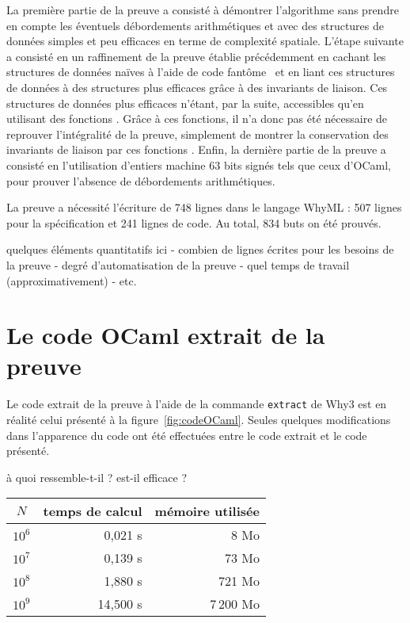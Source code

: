 \documentclass[a4paper]{easychair}
\begin{document}
La première partie de la preuve a consisté à démontrer l'algorithme sans prendre
en compte les éventuels débordements arithmétiques et avec des structures
de données simples et peu efficaces en terme de complexité spatiale.
L'étape suivante a consisté en un raffinement de la preuve établie précédemment
en cachant les structures de données naïves à l'aide de code
fantôme~\cite{ghost-code} et en liant ces structures de données à des structures
plus efficaces grâce à des invariants de liaison. Ces structures de données plus
efficaces n'étant, par la suite, accessibles qu'en utilisant des fonctions
. Grâce à ces fonctions, il n'a donc pas été
nécessaire de reprouver l'intégralité de la preuve, simplement de montrer la
conservation des invariants de liaison par ces fonctions .
Enfin, la dernière partie de la preuve a consisté en l'utilisation d'entiers
machine 63 bits signés tels que ceux d'OCaml, pour prouver l'absence de
débordements arithmétiques.


La preuve a nécessité l'écriture de 748 lignes dans le langage WhyML :
507 lignes pour la spécification et 241 lignes de code.
Au total, 834 buts on été prouvés.


quelques éléments quantitatifs ici
- combien de lignes écrites pour les besoins de la preuve
- degré d'automatisation de la preuve
- quel temps de travail (approximativement)
- etc.

\section{Le code OCaml extrait de la preuve}

Le code extrait de la preuve à l'aide de la commande \texttt{extract} de Why3
est en réalité celui présenté à la figure~\ref{fig:codeOCaml}.
Seules quelques modifications dans l'apparence du code ont été effectuées
entre le code extrait et le code présenté.

à quoi ressemble-t-il ?
est-il efficace ?

\begin{center}
  \begin{tabular}{|c|r|r|}
    \hline
    $N$ & temps de calcul & mémoire utilisée \\
    \hline\hline
    $10^6$ &  0,021 s &      8 Mo \\\hline
    $10^7$ &  0,139 s &     73 Mo \\\hline
    $10^8$ &  1,880 s &    721 Mo \\\hline
    $10^9$ & 14,500 s & 7\,200 Mo \\\hline
  \end{tabular}
\end{center}
\end{document}
